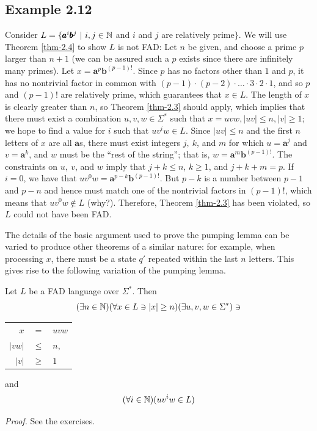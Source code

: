 \subsection*{Example 2.12}

Consider $L=\{\pmb{a}^i\pmb{b}^j\ |\ i,j \in \mathbb{N}$ and $i$ and $j$ are relatively
prime$\}$. We will use Theorem \ref{thm-2.4} to show $L$ is not FAD: Let $n$ be given, and
choose a prime $p$ larger than $n + 1$ (we can be assured such a $p$ exists
since there are infinitely many primes). Let $x=\pmb{a}^p\pmb{b}^{(p-1)!}$.
Since $p$ has no factors other than $1$ and $p$, it has no nontrivial factor in
common with $(p-1) \cdot (p-2) \cdot \ldots \cdot 3 \cdot 2 \cdot 1$, and so $p$
and $(p-1)!$ are relatively prime, which guarantees that $x \in L$. The length
of $x$ is clearly greater than $n$, so Theorem \ref{thm-2.3} should apply, which implies
that there must exist a combination $u,v,w \in \Sigma^*$ such that $x = uvw,
|uv| \leq n, |v| \geq 1$; we hope to find a value for $i$ such that $uv^iw \in L$.
Since $|uv| \leq n$ and the first $n$ letters of $x$ are all $\pmb{a}$s, there
must exist integers $j,\ k$, and $m$ for which $u=\pmb{a}^j$ and $v=\pmb{a}^k$,
and $w$ must be the ``rest of the string''; that is, $w=\pmb{a}^m
\pmb{b}^{(p-1)!}$. The constraints on $u,\ v$, and $w$ imply that $j + k \leq n$,
$k \geq 1$, and $j + k + m = p$. If $i = 0$, we have that $uv^{0} w =
\pmb{a}^{p-k}\pmb{b}^{(p-1)!}$. But $p-k$ is a number between $p-1$ and $p-n$
and hence must match one of the nontrivial factors in $(p-1)!$, which means that
$uv^{0} w \not \in L$ (why?). Therefore, Theorem \ref{thm-2.3} has been violated, so $L$
could not have been FAD.

The details of the basic argument used to prove the pumping lemma can be varied
to produce other theorems of a similar nature: for example, when processing $x$,
there must be a state $q'$ repeated within the last $n$ letters. This gives rise
to the following variation of the pumping lemma.

\begin{thm}\label{thm-2.5}
Let $L$ be a FAD language over $\Sigma^*$. Then
\[ (\exists n \in \mathbb{N})(\forall x \in L \ni |x| \geq n)(\exists u,v,w \in
	\Sigma^*) \ni \]
\begin{center}\begin{tabular}{rcl}
$x$ & $=$ & $uvw$ \\
$|vw|$ & $\leq$ & $n$, \\
$|v|$ & $\geq$ & $1$ \\
\end{tabular}\end{center}
and
\[ (\forall i \in \mathbb{N})(uv^iw \in L) \]

\emph{Proof.} See the exercises.
\end{thm}

